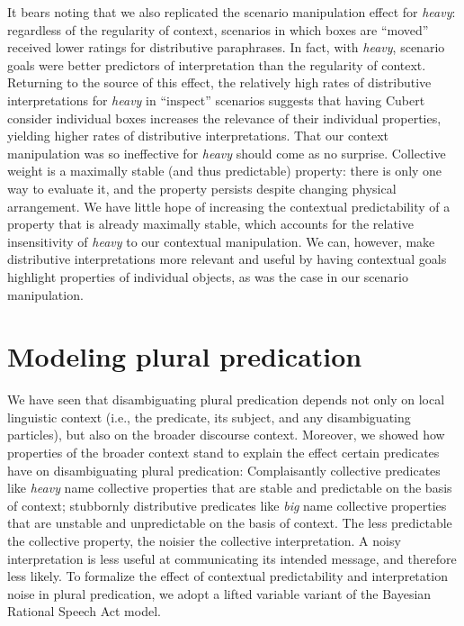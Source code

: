 \documentclass[linguex]{sp}
\begin{document}
It bears noting that we also replicated the scenario manipulation effect for \emph{heavy}: regardless of the regularity of context, scenarios in which boxes are ``moved'' received lower ratings for distributive paraphrases. In fact, with \emph{heavy}, scenario goals were better predictors of interpretation than the regularity of context. Returning to the source of this effect, the relatively high rates of distributive interpretations for \emph{heavy} in ``inspect'' scenarios suggests that having Cubert consider individual boxes increases the relevance of their individual properties, yielding higher rates of distributive interpretations. That our context manipulation was so ineffective for \textit{heavy} should come as no surprise. Collective weight is a maximally stable (and thus predictable) property: there is only one way to evaluate it, and the property persists despite changing physical arrangement. We have little hope of increasing the contextual predictability of a property that is already maximally stable, which accounts for the relative insensitivity of \emph{heavy} to our contextual manipulation. We can, however, make distributive interpretations more relevant and useful by having contextual goals highlight properties of individual objects, as was the case in our scenario manipulation.


\section{Modeling plural predication}

We have seen that disambiguating plural predication depends not only on local linguistic context (i.e., the predicate, its subject, and any disambiguating particles), but also on the broader discourse context. Moreover, we showed how properties of the broader context stand to explain the effect certain predicates have on disambiguating plural predication: Complaisantly collective predicates like \emph{heavy} name collective properties that are stable and predictable on the basis of context; stubbornly distributive predicates like \emph{big} name collective properties that are unstable and unpredictable on the basis of context. The less predictable the collective property, the noisier the collective interpretation. A noisy interpretation is less useful at communicating its intended message, and therefore less likely. To formalize the effect of contextual predictability and interpretation noise in plural predication, we adopt a lifted variable variant of the Bayesian Rational Speech Act model.
\end{document}
